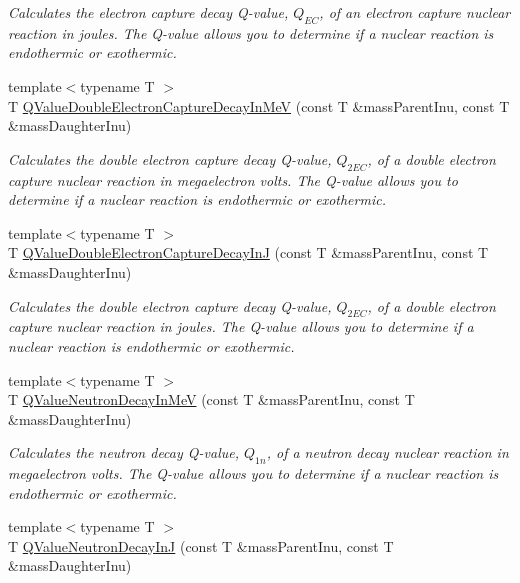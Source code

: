 \begin{DoxyCompactItemize}
\begin{DoxyCompactList}\small\item\em Calculates the electron capture decay Q-\/value, $Q_{EC}$, of an electron capture nuclear reaction in joules. The Q-\/value allows you to determine if a nuclear reaction is endothermic or exothermic. \end{DoxyCompactList}\item 
{\footnotesize template$<$typename T $>$ }\\T \hyperlink{group___q_value_ga93e5774784c0d9551e46ba19e1dbc9ab}{Q\+Value\+Double\+Electron\+Capture\+Decay\+In\+MeV} (const T \&mass\+Parent\+Inu, const T \&mass\+Daughter\+Inu)
\begin{DoxyCompactList}\small\item\em Calculates the double electron capture decay Q-\/value, $Q_{2EC}$, of a double electron capture nuclear reaction in megaelectron volts. The Q-\/value allows you to determine if a nuclear reaction is endothermic or exothermic. \end{DoxyCompactList}\item 
{\footnotesize template$<$typename T $>$ }\\T \hyperlink{group___q_value_gae25e179b76580bc6af7fa4bdf938ba4e}{Q\+Value\+Double\+Electron\+Capture\+Decay\+InJ} (const T \&mass\+Parent\+Inu, const T \&mass\+Daughter\+Inu)
\begin{DoxyCompactList}\small\item\em Calculates the double electron capture decay Q-\/value, $Q_{2EC}$, of a double electron capture nuclear reaction in joules. The Q-\/value allows you to determine if a nuclear reaction is endothermic or exothermic. \end{DoxyCompactList}\item 
{\footnotesize template$<$typename T $>$ }\\T \hyperlink{group___q_value_gaf854b3ac07909a87f44be4e38ebb0c32}{Q\+Value\+Neutron\+Decay\+In\+MeV} (const T \&mass\+Parent\+Inu, const T \&mass\+Daughter\+Inu)
\begin{DoxyCompactList}\small\item\em Calculates the neutron decay Q-\/value, $Q_{1n}$, of a neutron decay nuclear reaction in megaelectron volts. The Q-\/value allows you to determine if a nuclear reaction is endothermic or exothermic. \end{DoxyCompactList}\item 
{\footnotesize template$<$typename T $>$ }\\T \hyperlink{group___q_value_gab9ffbd12c3f814e03f0ed1fbdcba0700}{Q\+Value\+Neutron\+Decay\+InJ} (const T \&mass\+Parent\+Inu, const T \&mass\+Daughter\+Inu)

\end{DoxyCompactItemize}
